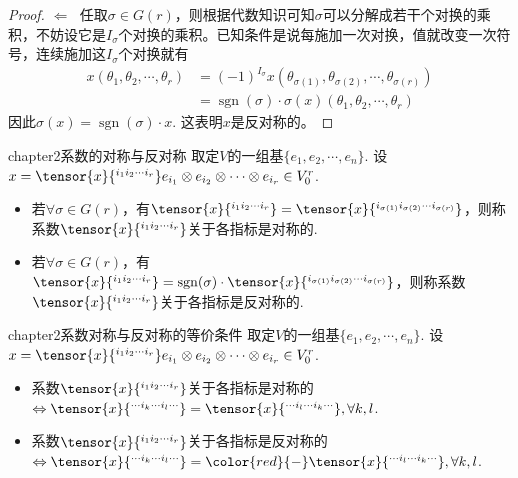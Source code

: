 \begin{proof}
$\Leftarrow\;$ 任取$\sigma\in G(r)$，则根据代数知识可知$\sigma$可以分解成若干个对换的乘积，不妨设它是$I_{\sigma}$个对换的乘积。已知条件是说每施加一次对换，值就改变一次符号，连续施加这$I_{\sigma}$个对换就有
\[
\begin{split}
x(\theta_{1},\theta_{2},\cdots,\theta_{r})&=(-1)^{I_{\sigma}}x(\theta_{\sigma(1)},\theta_{\sigma(2)},\cdots,\theta_{\sigma(r)})\\
&=\operatorname{sgn}(\sigma)\cdot \sigma(x)(\theta_{1},\theta_{2},\cdots,\theta_{r})
\end{split}
\]
因此$\sigma(x)=\operatorname{sgn}(\sigma)\cdot x$. 这表明$x$是反对称的。
\end{proof}

\begin{mydef}{}{chapter2系数的对称与反对称}
	取定$V$的一组基$\{e_{1} ,e_{2},\cdots,e_{n}\}$. 设$x=\tensor{x}{^{i_{1}i_{2}\cdots i_{r}}}e_{i_{1}}\otimes e_{i_{2}}\otimes \cdots \otimes e_{i_{r}}\in V^{r}_{0}$.
	\begin{itemize}
	\item 若$\forall \sigma\in G(r)$，有$\tensor{x}{^{i_{1}i_{2}\cdots i_{r}}}=\tensor{x}{^{i_{\sigma(1)}i_{\sigma(2)}\cdots i_{\sigma(r)}}}$，则称系数$\tensor{x}{^{i_{1}i_{2}\cdots i_{r}}}$关于各指标是对称的.
	\item 若$\forall \sigma\in G(r)$，有$\tensor{x}{^{i_{1}i_{2}\cdots i_{r}}}=\operatorname{sgn}(\sigma)\cdot \tensor{x}{^{i_{\sigma(1)}i_{\sigma(2)}\cdots i_{\sigma(r)}}}$，则称系数$\tensor{x}{^{i_{1}i_{2}\cdots i_{r}}}$关于各指标是反对称的.
	\end{itemize}
\end{mydef}

\begin{myprop}{}{chapter2系数对称与反对称的等价条件}
	取定$V$的一组基$\{e_{1} ,e_{2},\cdots,e_{n}\}$. 设$x=\tensor{x}{^{i_{1}i_{2}\cdots i_{r}}}e_{i_{1}}\otimes e_{i_{2}}\otimes \cdots \otimes e_{i_{r}}\in V^{r}_{0}$.
	\begin{itemize}
	\item[(1)] 系数$\tensor{x}{^{i_{1}i_{2}\cdots i_{r}}}$关于各指标是对称的$\Leftrightarrow \tensor{x}{^{\cdots i_{k}\cdots i_{l}\cdots }}=\tensor{x}{^{\cdots i_{l}\cdots i_{k}\cdots }},\forall k,l$.
	\item[(2)] 系数$\tensor{x}{^{i_{1}i_{2}\cdots i_{r}}}$关于各指标是反对称的$\Leftrightarrow \tensor{x}{^{\cdots i_{k}\cdots i_{l}\cdots }}={\color{red}{-}}\tensor{x}{^{\cdots i_{l}\cdots i_{k}\cdots }},\forall k,l$.
	\end{itemize}
\end{myprop}

